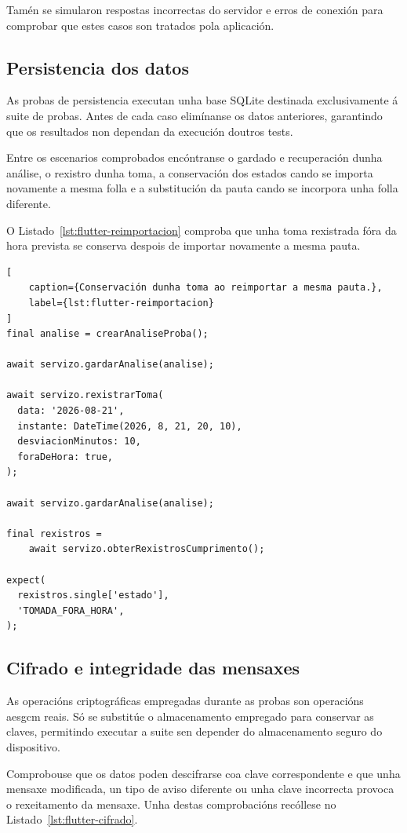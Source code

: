 Tamén se simularon respostas incorrectas do servidor e erros de conexión para comprobar que estes casos son tratados pola aplicación.


\subsection{Persistencia dos datos}

As probas de persistencia executan unha base SQLite destinada exclusivamente á suite de probas. Antes de cada caso elimínanse os datos anteriores, garantindo que os resultados non dependan da execución doutros tests.

Entre os escenarios comprobados encóntranse o gardado e recuperación dunha análise, o rexistro dunha toma, a conservación dos estados cando se importa novamente a mesma folla e a substitución da pauta cando se incorpora unha folla diferente.

O Listado~\ref{lst:flutter-reimportacion} comproba que unha toma rexistrada fóra da hora prevista se conserva despois de importar novamente a mesma pauta.

\begin{lstlisting}[
    caption={Conservación dunha toma ao reimportar a mesma pauta.},
    label={lst:flutter-reimportacion}
]
final analise = crearAnaliseProba();

await servizo.gardarAnalise(analise);

await servizo.rexistrarToma(
  data: '2026-08-21',
  instante: DateTime(2026, 8, 21, 20, 10),
  desviacionMinutos: 10,
  foraDeHora: true,
);

await servizo.gardarAnalise(analise);

final rexistros =
    await servizo.obterRexistrosCumprimento();

expect(
  rexistros.single['estado'],
  'TOMADA_FORA_HORA',
);
\end{lstlisting}


\subsection{Cifrado e integridade das mensaxes}

As operacións criptográficas empregadas durante as probas son operacións \gls{aesgcm} reais. Só se substitúe o almacenamento empregado para conservar as claves, permitindo executar a suite sen depender do almacenamento seguro do dispositivo.

Comprobouse que os datos poden descifrarse coa clave correspondente e que unha mensaxe modificada, un tipo de aviso diferente ou unha clave incorrecta provoca o rexeitamento da mensaxe. Unha destas comprobacións recóllese no Listado~\ref{lst:flutter-cifrado}.

